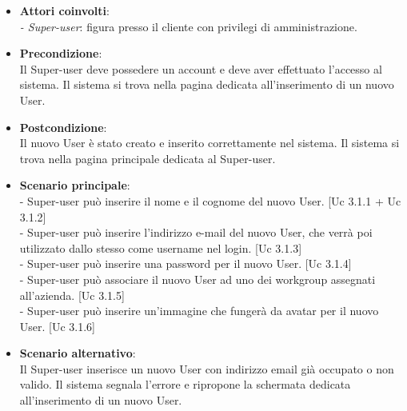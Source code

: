 \documentclass[10pt,a4paper]{article}
\begin{document}
\begin{itemize}
\item \textbf{Attori coinvolti}:\\
\emph{- Super-user}: figura presso il cliente con privilegi di amministrazione.

\item \textbf{Precondizione}:\\
Il Super-user deve possedere un account e deve aver effettuato l'accesso al sistema. Il sistema si trova nella pagina dedicata all'inserimento di un nuovo User.

\item \textbf{Postcondizione}:\\
Il nuovo User è stato creato e inserito correttamente nel sistema. Il sistema si trova nella pagina principale dedicata al Super-user.

\item \textbf{Scenario principale}:\\
- Super-user può inserire il nome e il cognome del nuovo User. [Uc 3.1.1 + Uc 3.1.2]\\
- Super-user può inserire l'indirizzo e-mail del nuovo User, che verrà poi utilizzato dallo stesso come username nel login. [Uc 3.1.3]\\
- Super-user può inserire una password per il nuovo User. [Uc 3.1.4]\\
- Super-user può associare il nuovo User ad uno dei workgroup assegnati all'azienda. [Uc 3.1.5]\\
- Super-user può inserire un'immagine che fungerà da avatar per il nuovo User. [Uc 3.1.6]

\item \textbf{Scenario alternativo}:\\
Il Super-user inserisce un nuovo User con indirizzo email già occupato o non valido. Il sistema segnala l'errore e ripropone la schermata dedicata all'inserimento di un nuovo User.

\end{itemize}

\newpage
\end{document}
